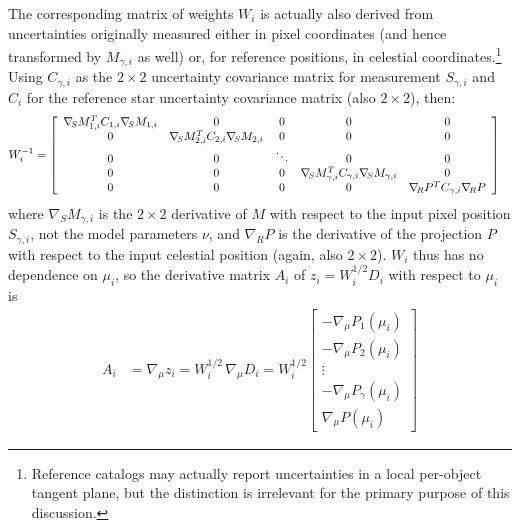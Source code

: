 The corresponding matrix of weights $W_i$ is actually also derived from uncertainties originally measured either in pixel coordinates (and hence transformed by $M_{\gamma,i}$ as well) or, for reference positions, in celestial coordinates.\footnote{Reference catalogs may actually report uncertainties in a local per-object tangent plane, but the distinction is irrelevant for the primary purpose of this discussion.}
Using $C_{\gamma,i}$ as the $2\times 2$ uncertainty covariance matrix for measurement $S_{\gamma,i}$ and $C_{i}$ for the reference star uncertainty covariance matrix (also $2\times 2$), then:
\begin{align}
    W_i^{-1} &= \left[
        \begin{array}{ c c c c c }
            \nabla\!_S M_{1, i}^T C_{1,i} \nabla\!_S M_{1, i} & 0 & 0 & 0 & 0 \\
            0 & \nabla\!_S M_{2, i}^T C_{2,i} \nabla\!_S M_{2, i} & 0 & 0 & 0 \\
            0 & 0 & \ddots & 0 & 0 \\
            0 & 0 & 0 & \nabla\!_S M_{\gamma, i}^T C_{\gamma,i} \nabla\!_S M_{\gamma, i} & 0 \\
            0 & 0 & 0 & 0 & \nabla\!_R P^T C_{\gamma,i} \nabla\!_R P
        \end{array}
    \right]
\end{align}
where $\nabla\!_S M_{\gamma,i}$ is the $2\times 2$ derivative of $M$ with respect to the input pixel position $S_{\gamma,i}$, not the model parameters $\nu$, and $\nabla\!_R P$ is the derivative of the projection $P$ with respect to the input celestial position (again, also $2\times 2$).
$W_i$ thus has no dependence on $\mu_i$, so the derivative matrix $A_i$ of $z_i = W_i^{1/2} D_i$ with respect to $\mu_i$ is
\begin{align}
    A_i &= \nabla\!_{\mu} z_i = W_i^{1/2} \, \nabla\!_{\mu} D_i
        = W_i^{1/2}\left[
            \begin{array}{ c }
                - \nabla\!_{\mu} P_1\left(\mu_i\right) \\
                - \nabla\!_{\mu} P_2\left(\mu_i\right) \\
                \vdots \\
                - \nabla\!_{\mu} P_{\gamma}\left(\mu_i\right) \\
                \nabla\!_{\mu} P\left(\mu_i\right)
            \end{array}
        \right]
\end{align}

